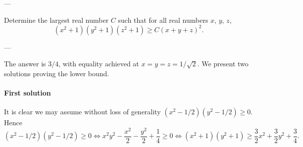 
---

Determine the largest real number $C$ such that for all real numbers $x$, $y$, $z$, \[\left(x^2+1\right)\left(y^2+1\right)\left(z^2+1\right)\ge C(x+y+z)^2.\]

---

The answer is $3/4$, with equality achieved at $x=y=z=1/\sqrt2$. We present two solutions proving the lower bound.

\paragraph{First solution} It is clear we may assume without loss of generality $(x^2-1/2)(y^2-1/2)\ge0$. Hence \[\left(x^2-1/2\right)\left(y^2-1/2\right)\ge0\iff x^2y^2-\frac{x^2}2-\frac{y^2}2+\frac14\ge0\iff\left(x^2+1\right)\left(y^2+1\right)\ge\frac32x^2+\frac32y^2+\frac34.\]

